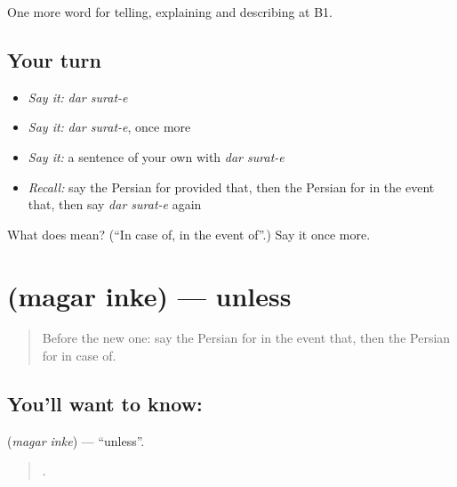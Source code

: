 \begin{grammarlens}[title={What you've built}]
One more word for telling, explaining and describing at B1.
\end{grammarlens}

\subsection*{Your turn}
\begin{itemize}
\raggedright
  \item \emph{Say it:} \emph{dar surat-e}
  \item \emph{Say it:} \emph{dar surat-e}, once more
  \item \emph{Say it:} a sentence of your own with \emph{dar surat-e}
  \item \emph{Recall:} say the Persian for provided that, then the Persian for in the event that, then say \emph{dar surat-e} again
\end{itemize}

\begin{tcolorbox}[breakable,colback=teal!4,colframe=teal!35!black,title={Before you move on}]
What does   mean? (\textquotedblleft{}In case of, in the event of\textquotedblright{}.) Say it once more.
\end{tcolorbox}
\section[\texorpdfstring{\fa{مگر} \fa{اینکه} (magar inke)}{مگر اینکه (magar inke)}]{  (magar inke) — unless}

\label{lesson:FA-C390-magar-inke}



\begin{quote}
Before the new one: say the Persian for in the event that, then the Persian for in case of.
\end{quote}

\subsection*{You'll want to know:  }
\textbf{ } (\emph{magar inke}) — \textquotedblleft{}unless\textquotedblright{}.

\begin{quote}
     .
\end{quote}

